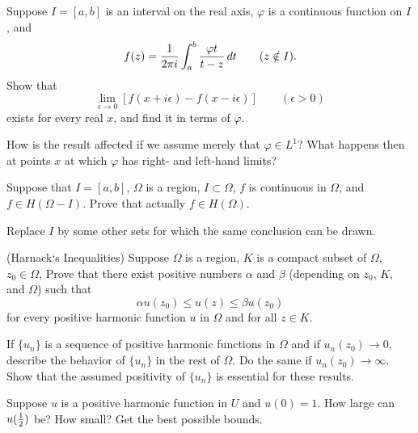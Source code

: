 \begin{enumerate}
\begin{excopy}
Suppose \(I=[a,b]\) is an interval on the real axis, 
\(\varphi\) is a continuous function on $I$, and
\begin{equation*}
f(z) = \frac{1}{2\pi i} \int_a^b \frac{\varphi{t}}{t - z}\,dt \qquad (z \notin I).
\end{equation*}
Show that
\begin{equation*}
\lim_{\epsilon\to 0}[f(x+i\epsilon) - f(x-i\epsilon)] \qquad (\epsilon > 0)
\end{equation*}
exists for every real $x$, and find it in terms of \(\varphi\).

How is the result affected if we assume merely that \(\varphi \in L^1\)?
What happens then at points $x$ at
which \(\varphi\) has right- and left-hand limits?
\end{excopy}


\begin{excopy}
Suppose that \(I=[a,b]\), \(\Omega\) is a region, \(I \subset \Omega\),
$f$ is continuous in \(\Omega\), and \(f \in H(\Omega - I)\). Prove that
actually \(f \in H(\Omega)\).

Replace $I$ by some other sets for which the same conclusion can be drawn.
\end{excopy}


\begin{excopy}
 (Harnack‘s Inequalities) 
Suppose \(\Omega\) is a region, $K$ is a compact subset of \(\Omega\),
\(z_0 \in \Omega\), Prove that
there exist positive numbers \(\alpha\) and \(\beta\) 
(depending on \(z_0\), $K$, and \(\Omega\)) such that
\begin{equation*}
\alpha u(z_0) \leq u(z) \leq \beta u(z_0)
\end{equation*}
for every positive harmonic function $u$ in \(\Omega\) and for all \(z \in K\).

If \(\{u_n\}\) is a sequence of positive harmonic functions in \(\Omega\)
 and if \(u_n(z_0)\to 0\), describe the behavior
of \(\{u_n\}\) in the rest of \(\Omega\). Do the same if \(u_n(z_0)\to \infty\).
 Show that the assumed positivity of \(\{u_n\}\) is
essential for these results.
\end{excopy}


\begin{excopy}
Suppose $u$ is a positive harmonic function in $U$ and \(u(0) = 1\).
How large can \(u(\frac{1}{2})\) be? How small?
Get the best possible bounds.
\end{excopy}



\end{enumerate}
